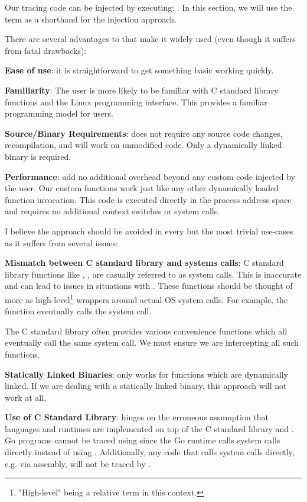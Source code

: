 Our tracing code can be injected by executing: . In this section, we will use the term \ldpreload as a shorthand for the \ldpreload injection approach.

There are several advantages to \ldpreload{} that make it widely used (even though it suffers from fatal drawbacks):
\begin{compactitem}
    \item \textbf{Ease of use}: it is straightforward to get something basic working quickly.
    \item \textbf{Familiarity}: The user is more likely to be familiar with C standard library functions and the Linux programming interface. This provides a familiar programming model for users.
    \item \textbf{Source/Binary Requirements}: \ldpreload{} does not require any source code changes, recompilation, and will work on unmodified code. Only a dynamically linked binary is required.
    \item \textbf{Performance}: \ldpreload{} add no additional overhead beyond any custom code injected by the user. Our custom functions work just like any other dynamically loaded function invocation. This code is executed directly in the process address space and requires no additional context switches or system calls.
\end{compactitem}

I believe the \ldpreload{} approach should be avoided in every but the most trivial use-cases as it suffers from several issues:
\begin{compactitem}
    \item \textbf{Mismatch between C standard library and systems calls}: C standard library functions like , ,  are casually referred to as system calls. This is inaccurate and can lead to issues in situations with \ldpreload{}. These functions should be thought of more as high-level\footnote{"High-level" being a relative term in this context.} wrappers around actual OS system calls. For example, the  function eventually calls the  system call.
    
    The C standard library often provides various convenience functions which all eventually call the same system call. We must ensure we are intercepting all such functions.
    \item \textbf{Statically Linked Binaries}: \ldpreload{} only works for functions which are
    dynamically linked. If we are dealing with a statically linked binary, this approach will not work at all.
    \item \textbf{Use of C Standard Library}: \ldpreload hinges on the erroneous assumption that languages and runtimes are implemented on top of the C standard library and . Go programs cannot be traced using \ldpreload{} since the Go runtime calls system calls directly instead of using . Additionally, any code that calls system calls directly, e.g. via assembly, will not be traced by \ldpreload.
\end{compactitem}

